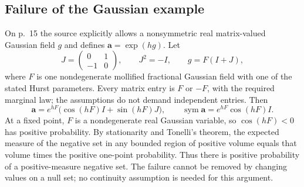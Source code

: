 \documentclass[10pt]{article}
\begin{document}
\subsection*{Failure of the Gaussian example}
On p. 15 the source explicitly allows a nonsymmetric real matrix-valued Gaussian field \(g\) and defines \(\mathbf a=\exp(hg)\). Let \[J=\begin{pmatrix}0&1\\-1&0\end{pmatrix},\qquad J^2=-I,
 \qquad g=F(I+J),\] where \(F\) is one nondegenerate mollified fractional Gaussian field with one of the stated Hurst parameters. Every matrix entry is \(F\) or \(-F\), with the required marginal law; the assumptions do not demand independent entries. Then \[\mathbf a=e^{hF}\bigl(\cos(hF)I+\sin(hF)J\bigr),\qquad
 \operatorname{sym}\mathbf a=e^{hF}\cos(hF)I.\] At a fixed point, \(F\) is a nondegenerate real Gaussian variable, so \(\cos(hF)<0\) has positive probability. By stationarity and Tonelli’s theorem, the expected measure of the negative set in any bounded region of positive volume equals that volume times the positive one-point probability. Thus there is positive probability of a positive-measure negative set. The failure cannot be removed by changing values on a null set; no continuity assumption is needed for this argument.\par
\end{document}
